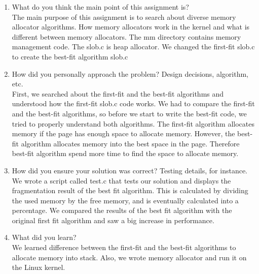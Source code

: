 \documentclass[onecolumn, draftclsnofoot,10pt, compsoc]{IEEEtran}
\begin{document}
    \begin{enumerate}
        \item What do you think the main point of this assignment is? \\
            The main purpose of this assignment is to search about diverse memory allocator algorithms. How memory allocators work in the kernel and what is different between memory allocators. The mm directory contains memory management code. The slob.c is heap allocator. We changed the first-fit slob.c to create the best-fit algorithm slob.c\\
            
        \item How did you personally approach the problem? Design decisions, algorithm, etc. \\
        	First, we searched about the first-fit and the best-fit algorithms and understood how the first-fit slob.c code works. We had to compare the first-fit and the best-fit algorithms, so before we start to write the best-fit code, we tried to properly understand both algorithms. The first-fit algorithm allocates memory if the page has enough space to allocate memory. However, the best-fit algorithm allocates memory into the best space in the page. Therefore best-fit algorithm spend more time to find the space to allocate memory. \\

        \item How did you ensure your solution was correct? Testing details, for instance. \\
            We wrote a script called test.c that tests our solution and displays the fragmentation result of the best fit algorithm. This is calculated by dividing the used memory by the free memory, and is eventually calculated into a percentage. We compared the results of the best fit algorithm with the original first fit algorithm and saw a big increase in performance. \\

        \item What did you learn? \\
            We learned difference between the first-fit and the best-fit algorithms to allocate memory into stack. Also, we wrote memory allocator and run it on the Linux kernel. 

            
     \end{enumerate} 
\end{document}
